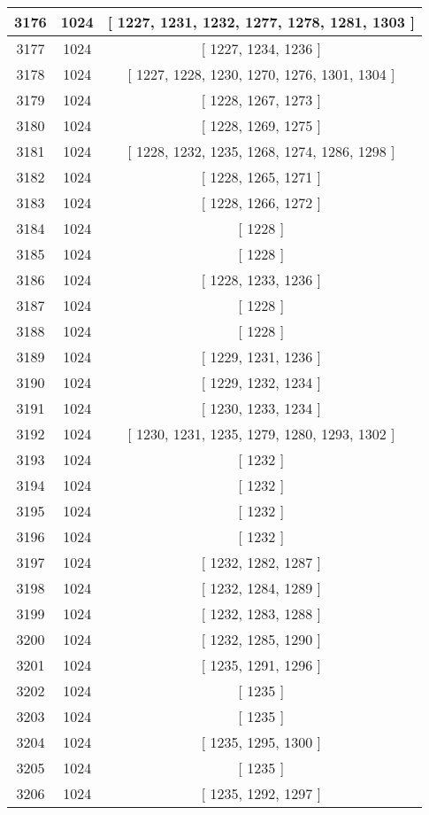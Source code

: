 \begin{center}
\begin{longtable}[H]{|| c c c ||}
\hline
3176 & 1024 & [ 1227, 1231, 1232, 1277, 1278, 1281, 1303 ] \\ 
\hline
3177 & 1024 & [ 1227, 1234, 1236 ] \\ 
\hline
3178 & 1024 & [ 1227, 1228, 1230, 1270, 1276, 1301, 1304 ] \\ 
\hline
3179 & 1024 & [ 1228, 1267, 1273 ] \\ 
\hline
3180 & 1024 & [ 1228, 1269, 1275 ] \\ 
\hline
3181 & 1024 & [ 1228, 1232, 1235, 1268, 1274, 1286, 1298 ] \\ 
\hline
3182 & 1024 & [ 1228, 1265, 1271 ] \\ 
\hline
3183 & 1024 & [ 1228, 1266, 1272 ] \\ 
\hline
3184 & 1024 & [ 1228 ] \\ 
\hline
3185 & 1024 & [ 1228 ] \\ 
\hline
3186 & 1024 & [ 1228, 1233, 1236 ] \\ 
\hline
3187 & 1024 & [ 1228 ] \\ 
\hline
3188 & 1024 & [ 1228 ] \\ 
\hline
3189 & 1024 & [ 1229, 1231, 1236 ] \\ 
\hline
3190 & 1024 & [ 1229, 1232, 1234 ] \\ 
\hline
3191 & 1024 & [ 1230, 1233, 1234 ] \\ 
\hline
3192 & 1024 & [ 1230, 1231, 1235, 1279, 1280, 1293, 1302 ] \\ 
\hline
3193 & 1024 & [ 1232 ] \\ 
\hline
3194 & 1024 & [ 1232 ] \\ 
\hline
3195 & 1024 & [ 1232 ] \\ 
\hline
3196 & 1024 & [ 1232 ] \\ 
\hline
3197 & 1024 & [ 1232, 1282, 1287 ] \\ 
\hline
3198 & 1024 & [ 1232, 1284, 1289 ] \\ 
\hline
3199 & 1024 & [ 1232, 1283, 1288 ] \\ 
\hline
3200 & 1024 & [ 1232, 1285, 1290 ] \\ 
\hline
3201 & 1024 & [ 1235, 1291, 1296 ] \\ 
\hline
3202 & 1024 & [ 1235 ] \\ 
\hline
3203 & 1024 & [ 1235 ] \\ 
\hline
3204 & 1024 & [ 1235, 1295, 1300 ] \\ 
\hline
3205 & 1024 & [ 1235 ] \\ 
\hline
3206 & 1024 & [ 1235, 1292, 1297 ] \\ 

\end{longtable}
\end{center}
